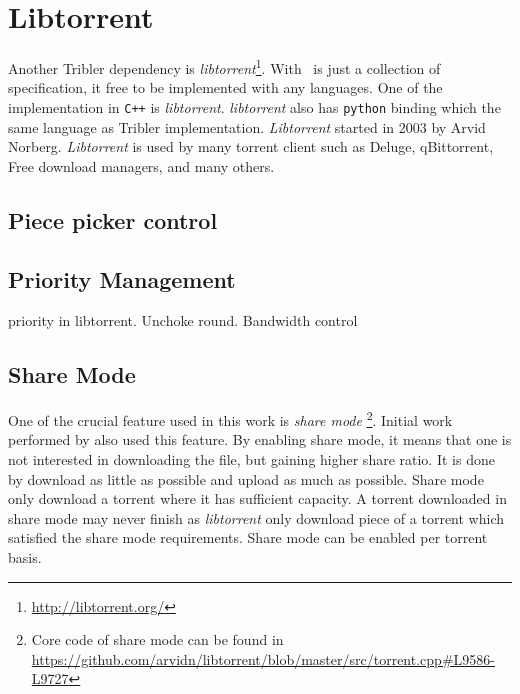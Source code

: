 \section{Libtorrent}
\label{section:libtorrent}
Another Tribler dependency is \textit{libtorrent}\footnote{\url{http://libtorrent.org/}}. With \bt~is just a collection of specification, it free to be implemented with any languages. One of the implementation in \texttt{C++} is \textit{libtorrent}. \textit{libtorrent} also has \texttt{python} binding which the same language as Tribler implementation. \textit{Libtorrent} started in 2003 by Arvid Norberg. \textit{Libtorrent} is used by many torrent client such as Deluge, qBittorrent, Free download managers, and many others.

\subsection{Piece picker control}

\subsection{Priority Management}
priority in libtorrent. Unchoke round. Bandwidth control

\subsection{Share Mode}
\label{section:sharemode}
One of the crucial feature used in this work is \textit{share mode} \footnote{Core code of share mode can be found in \url{https://github.com/arvidn/libtorrent/blob/master/src/torrent.cpp\#L9586-L9727}}. Initial work performed by \citeauthor{2015:creditmining:capota} also used this feature\cite{2015:creditmining:capota}. By enabling share mode, it means that one is not interested in downloading the file, but gaining higher share ratio. It is done by download as little as possible and upload as much as possible. Share mode only download a torrent where it has sufficient capacity. A torrent downloaded in share mode may never finish as \textit{libtorrent} only download piece of a torrent which satisfied the share mode requirements. Share mode can be enabled per torrent basis.


